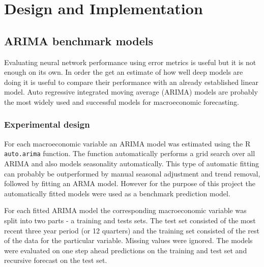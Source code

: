 \chapter{Design and Implementation}


\section{ARIMA benchmark models}
Evaluating neural network performance using error metrics is useful but it is not enough on its own. In order the get an estimate of how well deep models are doing it is useful to compare their performance with an already established linear model. Auto regressive integrated moving average (ARIMA) models are probably the most widely used and successful models for macroeconomic forecasting. 

\subsection{Experimental design}
For each macroeconomic variable an ARIMA model was estimated using the R \lstinline[language=R]{auto.arima} function. The function automatically performs a grid search over all ARIMA and also models seasonality automatically. This type of automatic fitting can probably be outperformed by manual seasonal adjustment and trend removal, followed by fitting an ARMA model. However for the purpose of this project the automatically fitted models were used as a benchmark prediction model.
\newline

For each fitted ARIMA model the corresponding macroeconomic variable was split into two parts - a training and tests sets. The test set consisted of the most recent three year period (or 12 quarters) and the training set consisted of the rest of the data for the particular variable. Missing values were ignored. The models were evaluated on one step ahead predictions on the training and test set and recursive forecast on the test set.